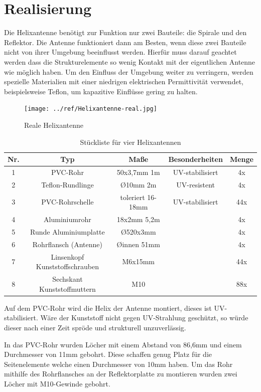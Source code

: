 \section{Realisierung}
Die Helixantenne benötigt zur Funktion nur zwei Bauteile: die Spirale und den Reflektor. Die Antenne funktioniert dann am Besten, wenn diese zwei Bauteile nicht von ihrer Umgebung beeinflusst werden. Hierfür muss darauf geachtet werden dass die Strukturelemente so wenig Kontakt mit der eigentlichen Antenne wie möglich haben. Um den Einfluss der Umgebung weiter zu verringern, werden spezielle Materialien mit einer niedrigen elektrischen Permittivität verwendet, beispielsweise Teflon, um kapazitive Einflüsse gering zu halten. 

\begin{figure}[H]
	\centering
	\texttt{[image: ../ref/Helixantenne-real.jpg]}
	\caption{Reale Helixantenne}
	\label{fig:helix-real}
\end{figure}

\begin{table}
	\begin{tabular}{|c|c|c|c|c|}
	\hline
	Nr. & Typ & Maße & Besonderheiten & Menge \\
	\hline
	1 & PVC-Rohr & 50x3,7mm 1m & UV-stabilisiert & 4x \\
	\hline
	2 & Teflon-Rundlinge & \O 10mm 2m & UV-resistent & 4x \\
	\hline
	3 & PVC-Rohrschelle & toleriert 16-18mm & UV-stabilisiert & 44x \\
	\hline
	4 & Aluminiumrohr & 18x2mm 5,2m & & 4x \\
	\hline
	5 & Runde Aluminiumplatte & \O 520x3mm & & 4x \\
	\hline
	6 & Rohrflansch (Antenne) & \O innen 51mm &  & 4x \\
	\hline
	7 & Linsenkopf Kunststoffschrauben & M6x15mm &  & 44x \\
	\hline
	8 & Sechskant Kunststoffmuttern & M10 &  & 88x \\
	\hline
\end{tabular}
\caption{Stückliste für vier Helixantennen}
\end{table}

Auf dem PVC-Rohr wird die Helix der Antenne montiert, dieses ist UV-stabilisiert. Wäre der Kunststoff nicht gegen UV-Strahlung geschützt, so würde dieser nach einer Zeit spröde und strukturell unzuverlässig.

In das PVC-Rohr wurden Löcher mit einem Abstand von 86,6mm und einem Durchmesser von 11mm gebohrt. Diese schaffen genug Platz für die Seitenelemente welche einen Durchmesser von 10mm haben. Um das Rohr mithilfe des Rohrflansches an der Reflektorplatte zu montieren wurden zwei Löcher mit M10-Gewinde gebohrt.

